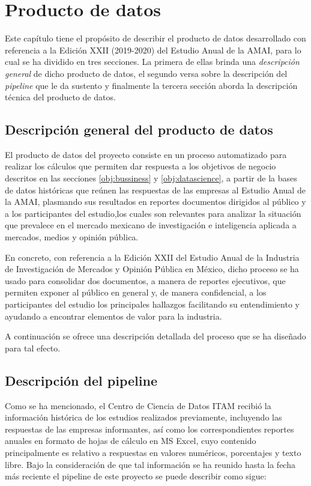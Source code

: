 \chapter{Producto de datos}

\noindent Este capítulo tiene el propósito de describir el producto de datos desarrollado con referencia a la Edición XXII (2019-2020) del Estudio Anual de la AMAI, para lo cual se ha dividido en tres secciones. La primera de ellas brinda una \emph{descripción general} de dicho producto de datos, el segundo versa sobre la descripción del \emph{pipeline} que le da sustento y finalmente la tercera sección aborda la descripción técnica del producto de datos.

\section{Descripción general del producto de datos}

El producto de datos del proyecto consiste en un proceso automatizado para realizar los cálculos que permiten dar respuesta a los objetivos de negocio descritos en las secciones \ref{obj:bussiness} y \ref{obj:datascience}, a partir de la bases de datos históricas que reúnen las respuestas de las empresas al Estudio Anual de la AMAI, plasmando sus resultados en reportes documentos dirigidos al público y a los participantes del estudio,los cuales son relevantes para analizar la situación que prevalece en el mercado mexicano de investigación e inteligencia aplicada a mercados, medios y opinión pública.

En concreto, con referencia a la Edición XXII del Estudio Anual de la Industria de Investigación de Mercados y Opinión Pública en México, dicho proceso se ha usado para consolidar dos documentos, a manera de reportes ejecutivos, que permiten exponer al público en general y, de manera confidencial, a los participantes del estudio los principales hallazgos facilitando   su   entendimiento   y   ayudando   a   encontrar elementos de valor para la industria.

A continuación se ofrece una descripción detallada del proceso que se ha diseñado para tal efecto.

\section{Descripción del pipeline}\label{dataproduct:process}

Como se ha mencionado, el Centro de Ciencia de Datos ITAM recibió la información histórica de los estudios realizados previamente, incluyendo las respuestas de las empresas informantes, así como los  correspondientes reportes anuales en formato de hojas de cálculo en MS Excel, cuyo contenido principalmente es relativo a respuestas en valores numéricos, porcentajes y texto libre. Bajo la consideración de que tal información se ha reunido hasta la fecha más reciente el pipeline de este proyecto se puede describir como sigue: 

